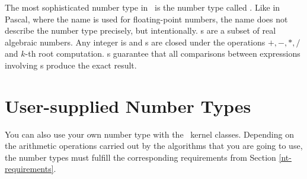 The most sophisticated number type in \leda\ is the number type called
. Like in Pascal, where the name  is used for
floating-point numbers, the name  does not describe the
number type precisely, but intentionally.  
s are a subset of real algebraic
numbers.  Any integer is  and s are closed under
the operations $+,-,*,/$ and $k$-th root computation. 
s guarantee that
all comparisons between expressions involving s produce the
exact result.


\section{User-supplied Number Types}

You can also use your own number type with the \cgal\ kernel classes.
Depending on the arithmetic operations carried out by the algorithms
that you are going to use, the number types must fulfill the
corresponding requirements from Section \ref{nt-requirements}. 

